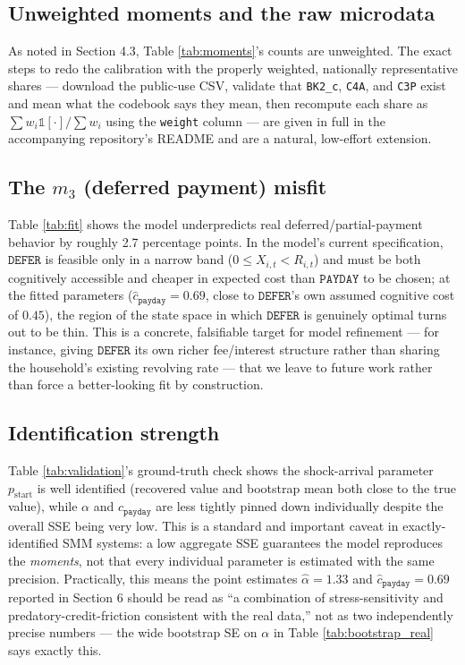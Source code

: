 \documentclass[12pt]{article}
\begin{document}
\subsection{Unweighted moments and the raw microdata}

As noted in Section 4.3, Table \ref{tab:moments}'s counts are unweighted. The exact steps to redo the calibration with the properly weighted, nationally representative shares — download the public-use CSV, validate that \texttt{BK2\_c}, \texttt{C4A}, and \texttt{C3P} exist and mean what the codebook says they mean, then recompute each share as $\sum w_i\mathbb 1[\cdot]/\sum w_i$ using the \texttt{weight} column — are given in full in the accompanying repository's README and are a natural, low-effort extension.

\subsection{The $m_3$ (deferred payment) misfit}

Table \ref{tab:fit} shows the model underpredicts real deferred/partial-payment behavior by roughly 2.7 percentage points. In the model's current specification, $\texttt{DEFER}$ is feasible only in a narrow band ($0 \le X_{i,t} < R_{i,t}$) and must be both cognitively accessible and cheaper in expected cost than $\texttt{PAYDAY}$ to be chosen; at the fitted parameters ($\hat c_{\texttt{payday}}=0.69$, close to $\texttt{DEFER}$'s own assumed cognitive cost of $0.45$), the region of the state space in which $\texttt{DEFER}$ is genuinely optimal turns out to be thin. This is a concrete, falsifiable target for model refinement — for instance, giving $\texttt{DEFER}$ its own richer fee/interest structure rather than sharing the household's existing revolving rate — that we leave to future work rather than force a better-looking fit by construction.

\subsection{Identification strength}

Table \ref{tab:validation}'s ground-truth check shows the shock-arrival parameter $p_{\text{start}}$ is well identified (recovered value and bootstrap mean both close to the true value), while $\alpha$ and $c_{\texttt{payday}}$ are less tightly pinned down individually despite the overall SSE being very low. This is a standard and important caveat in exactly-identified SMM systems: a low aggregate SSE guarantees the model reproduces the \emph{moments}, not that every individual parameter is estimated with the same precision. Practically, this means the point estimates $\hat\alpha=1.33$ and $\hat c_{\texttt{payday}}=0.69$ reported in Section 6 should be read as ``a combination of stress-sensitivity and predatory-credit-friction consistent with the real data,'' not as two independently precise numbers — the wide bootstrap SE on $\alpha$ in Table \ref{tab:bootstrap_real} says exactly this.
\end{document}
